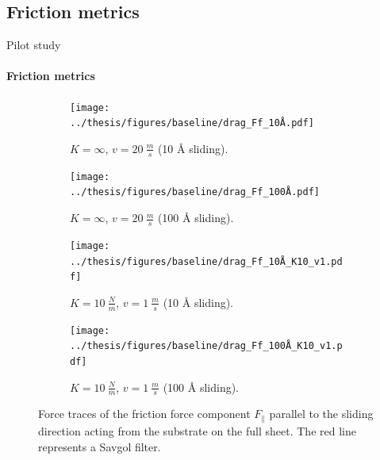 \documentclass[
	10pt, %
]{beamer}
\begin{document}
\subsection{Friction metrics}
\begin{frame}{Pilot study}
	\framesubtitle{Friction metrics}


\begin{figure}[H]
	\centering
	\begin{subfigure}[t]{0.49\textwidth}
		\centering
		\texttt{[image: ../thesis/figures/baseline/drag\_Ff\_10Å.pdf]}
		\caption{$K = \infty$, $v = \SI{20}{\frac{m}{s}}$ (10 Å sliding).}
	\end{subfigure}
	\hfill
	\begin{subfigure}[t]{0.49\textwidth}
		\centering
		\texttt{[image: ../thesis/figures/baseline/drag\_Ff\_100Å.pdf]}
		\caption{$K = \infty$, $v = \SI{20}{\frac{m}{s}}$ (100 Å sliding).}
	  \end{subfigure}
	\hfill
	\begin{subfigure}[t]{0.49\textwidth}
		\centering
		\texttt{[image: ../thesis/figures/baseline/drag\_Ff\_10Å\_K10\_v1.pdf]}
		\caption{$K = \SI{10}{\frac{N}{m}}$, $v = \SI{1}{\frac{m}{s}}$ (10 Å sliding).}
	\end{subfigure}
	\hfill
	\begin{subfigure}[t]{0.49\textwidth}
		\centering
		\texttt{[image: ../thesis/figures/baseline/drag\_Ff\_100Å\_K10\_v1.pdf]}
		\caption{$K = \SI{10}{\frac{N}{m}}$, $v = \SI{1}{\frac{m}{s}}$ (100 Å sliding).}
	\end{subfigure}
	   \caption{Force traces of the friction force component $F_\parallel$ parallel to the sliding direction acting from the substrate on the full sheet. The red line represents a Savgol filter.}
  \end{figure}
\end{frame}
%
%
\end{document}
